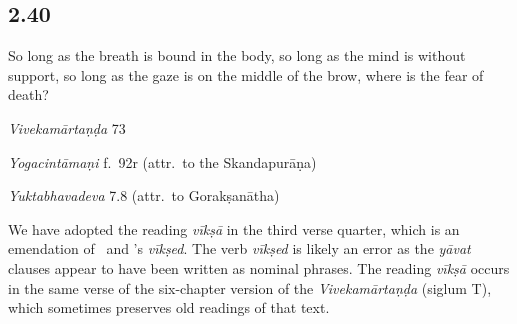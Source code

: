 \begin{ekdosis}
\subsection*{2.40}
\begin{translation}[hp02_040]
So long as the breath is bound in the body, so long as the mind is without support, so long as the gaze is on the middle of the brow, where is the fear of death?
\end{translation}

\begin{sources}[hp02_040]
\emph{Vivekamārtaṇḍa} 73

\begin{versinnote}
\tl{\var{vīkṣā] T; dṛṣṭir \emph{cett.}}}

\end{versinnote}
\end{sources}

\begin{testimonia}[hp02_040]
\emph{Yogacintāmaṇi} f.~92r (attr.~to the Skandapurāṇa)

\begin{versinnote}
\end{versinnote}

\emph{Yuktabhavadeva} 7.8 (attr.~to Gorakṣanātha)

\begin{versinnote}
\end{versinnote}
\end{testimonia}

\begin{philcomm}[hp02_040]
We have adopted the reading \emph{vīkṣā} in the third verse quarter, which is an emendation of \alphaOne\ and \alphaTwo's \emph{vīkṣed}. The verb \emph{vīkṣed} is likely an error as the \emph{yāvat} clauses appear to have been written as nominal phrases. The reading \emph{vīkṣā} occurs in the same verse of the six-chapter version of the \emph{Vivekamārtaṇḍa} (siglum T), which sometimes preserves old readings of that text.  


\end{philcomm}
\end{ekdosis}
